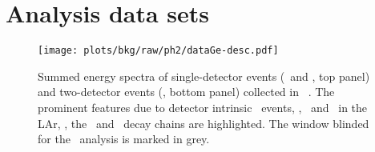 \section{Analysis data sets}%
\label{sec:bkg:raw:ph2:data}

\begin{figure}
  \centering
  \texttt{[image: plots/bkg/raw/ph2/dataGe-desc.pdf]}
  \caption{%
    Summed energy spectra of single-detector events (\enrBEGeII\ and \enrCoaxII, top
    panel) and two-detector events (\enrGeII, bottom panel) collected in \gerda\
    \phasetwo.  The prominent features due to detector intrinsic \nnbb\ events, \kvz,
    \Arl\ and \Kr\ in the LAr, \kvn, the \Thh\ and \Uh\ decay chains are highlighted. The
    window blinded for the \onbb\ analysis is marked in grey.
  }\label{fig:bkg:raw:ph2:datasets}
\end{figure}

\begin{table}
  \centering
  \caption{%
    Properties of the data sets considered in this analysis. Further details about the
    \gerda\ detectors can be found in past publications~\cite{Agostini2013a,
    Agostini2018a}.  Note that the \bege\ exposure of 31.1~\kgyr\ is higher than the one
    reported in~\cite{Agostini2019a} because additional data for which PSD methods are not
    applicable is here included.
  }\label{tab:bkg:raw:ph2:datasets}
  \small
  
\end{table}%

